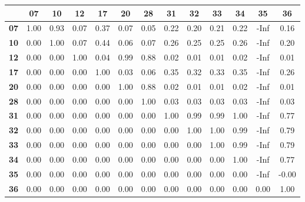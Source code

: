 \begin{tabular}{|l|c|c|c|c|c|c|c|c|c|c|c|c|}
\hline
&\textbf{07}&\textbf{10}&\textbf{12}&\textbf{17}&\textbf{20}&\textbf{28}&\textbf{31}&\textbf{32}&\textbf{33}&\textbf{34}&\textbf{35}&\textbf{36}\\\hline
\textbf{07}&1.00&0.93&0.07&0.37&0.07&0.05&0.22&0.20&0.21&0.22&-Inf&0.16\\\hline
\textbf{10}&0.00&1.00&0.07&0.44&0.06&0.07&0.26&0.25&0.25&0.26&-Inf&0.20\\\hline
\textbf{12}&0.00&0.00&1.00&0.04&0.99&0.88&0.02&0.01&0.01&0.02&-Inf&0.01\\\hline
\textbf{17}&0.00&0.00&0.00&1.00&0.03&0.06&0.35&0.32&0.33&0.35&-Inf&0.26\\\hline
\textbf{20}&0.00&0.00&0.00&0.00&1.00&0.88&0.02&0.01&0.01&0.02&-Inf&0.01\\\hline
\textbf{28}&0.00&0.00&0.00&0.00&0.00&1.00&0.03&0.03&0.03&0.03&-Inf&0.03\\\hline
\textbf{31}&0.00&0.00&0.00&0.00&0.00&0.00&1.00&0.99&0.99&1.00&-Inf&0.77\\\hline
\textbf{32}&0.00&0.00&0.00&0.00&0.00&0.00&0.00&1.00&1.00&0.99&-Inf&0.79\\\hline
\textbf{33}&0.00&0.00&0.00&0.00&0.00&0.00&0.00&0.00&1.00&0.99&-Inf&0.79\\\hline
\textbf{34}&0.00&0.00&0.00&0.00&0.00&0.00&0.00&0.00&0.00&1.00&-Inf&0.77\\\hline
\textbf{35}&0.00&0.00&0.00&0.00&0.00&0.00&0.00&0.00&0.00&0.00&-Inf&-0.00\\\hline
\textbf{36}&0.00&0.00&0.00&0.00&0.00&0.00&0.00&0.00&0.00&0.00&0.00&1.00\\\hline
\end{tabular}